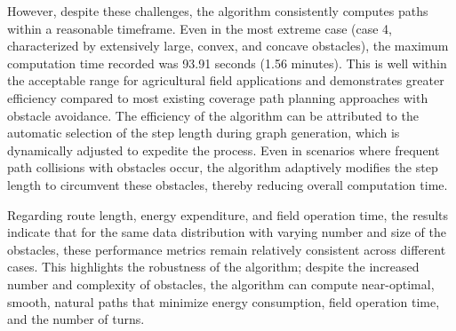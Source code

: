 However, despite these challenges, the algorithm consistently computes paths within a reasonable timeframe. Even in the most extreme case (case 4, characterized by extensively large, convex, and concave obstacles), the maximum computation time recorded was 93.91 seconds (1.56 minutes). This is well within the acceptable range for agricultural field applications and demonstrates greater efficiency compared to most existing coverage path planning approaches with obstacle avoidance. The efficiency of the algorithm can be attributed to the automatic selection of the step length during graph generation, which is dynamically adjusted to expedite the process. Even in scenarios where frequent path collisions with obstacles occur, the algorithm adaptively modifies the step length to circumvent these obstacles, thereby reducing overall computation time.


\vspace{3mm}

Regarding route length, energy expenditure, and field operation time, the results indicate that for the same data distribution with varying number and size of the obstacles, these performance metrics remain relatively consistent across different cases. This highlights the robustness of the algorithm; despite the increased number and complexity of obstacles, the algorithm can compute near-optimal, smooth, natural paths that minimize energy consumption, field operation time, and the number of turns.
